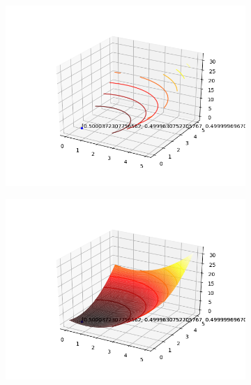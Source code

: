 \documentclass[a4paper, 12pt]{article}
\begin{document}
\begin{figure}[H]
\centering
\begin{subfigure}{0.3\textwidth}
  \centering
  \includegraphics[width=\linewidth]{1/D/x10x10/contorno.png}
\end{subfigure}%
\begin{subfigure}{0.3\textwidth}
  \centering
  \includegraphics[width=\linewidth]{1/D/x10x10/superficie.png}
\end{subfigure}
\begin{subfigure}{0.3\textwidth}
  \centering

\end{subfigure}
\end{figure}
\end{document}
